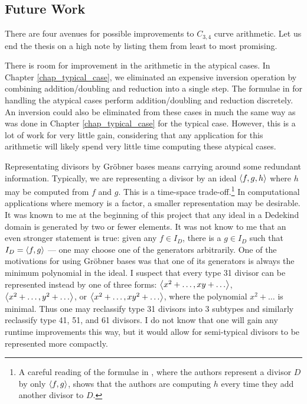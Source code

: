 
\subsection{Future Work}
\label{sec_future_work}

There are four avenues for possible improvements to $C_{3,4}$ curve arithmetic.
Let us end the thesis on a high note by listing them from least to most promising.

There is room for improvement in the arithmetic in the atypical cases.
In Chapter \ref{chap_typical_case}, we eliminated an expensive inversion operation
by combining addition/doubling and reduction into a single step.
The formulae in \cite{github} for handling the atypical cases perform addition/doubling and reduction discretely.
An inversion could also be eliminated from these cases
in much the same way as was done in Chapter \ref{chap_typical_case} for the typical case.
However, this is a lot of work for very little gain,
considering that any application for this arithmetic will likely spend very little time computing these atypical cases.

Representating divisors by Gr\"obner bases means carrying around some redundant information.
Typically, we are representing a divisor by an ideal $\left\langle f,g,h \right\rangle$ where $h$ may be computed from $f$ and $g$.
This is a time-space trade-off.\footnote{
A careful reading of the formulae in \cite{salem07}, where the authors represent a divisor $D$ by only $\left\langle f,g \right\rangle$,
shows that the authors are computing $h$ every time they add another divisor to $D$.}
In computational applications where memory is a factor, a smaller representation may be desirable.
It was known to me at the beginning of this project that any ideal in a Dedekind domain is generated by two or fewer elements.
It was not know to me that an even stronger statement is true:
given any $f \in I_D$, there is a $g \in I_D$ such that $I_D = \left\langle f,g \right\rangle$ ---
one may choose one of the generators arbitrarily.
One of the motivations for using Gr\"obner bases was that one of its generators is always the minimum polynomial in the ideal.
I suspect that every type 31 divisor can be represented instead by one of three forms:
$\left\langle x^2 + \ldots, xy + \ldots \right\rangle$, $\left\langle x^2 + \ldots, y^2 + \ldots \right\rangle$, or $\left\langle x^2 + \ldots, xy^2 + \ldots \right\rangle$,
where the polynomial $x^2 + \ldots$ is minimal.
Thus one may reclassify type 31 divisors into 3 subtypes and similarly reclassify type 41, 51, and 61 divisors.
I do not know that one will gain any runtime improvements this way,
but it would allow for semi-typical divisors to be represented more compactly.

